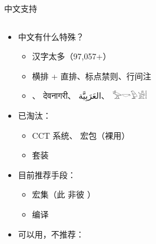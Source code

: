 \begin{frame}{中文支持}
\begin{columns}
\begin{column}{0.66\textwidth}
  \begin{itemize}
    \item 中文有什么特殊？\pause

      \begin{itemize}
        \item 汉字太多（97,057+）\pause
        \item 横排 + 直排、标点禁则、行间注  \pause
        \item {}、
              {\NotoDevanagari देवनागरी}、
              {\NotoArabic العَرَبِيَّة}、
              {\NotoEgyptian 𓅡𓎡𓅱𓀀𓏪}
      \end{itemize} \pause

    \item 已淘汰：

      \begin{itemize}
        \item CCT 系统、 宏包（裸用）
        \item \CTeX{} 套装
      \end{itemize} \pause

    \item 目前推荐手段：

      \begin{itemize}
        \item \alert{ 宏集}（此  非彼 \CTeX{}）
        \item \XeLaTeX{} 编译
      \end{itemize} \pause

    \item 可以用，不推荐：


\end{itemize}
\end{column}
\end{columns}
\end{frame}
